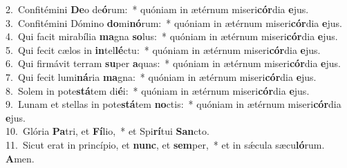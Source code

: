 {2.~}Confitémini \textbf{De}o de\textbf{ó}rum:~* quóniam in ætérnum miseri\textbf{cór}dia \textbf{e}jus.\\
{3.~}Confitémini Dómino \textbf{do}mi\textbf{nó}rum:~* quóniam in ætérnum miseri\textbf{cór}dia \textbf{e}jus.\\
{4.~}Qui facit mirabília \textbf{ma}gna \textbf{so}lus:~* quóniam in ætérnum miseri\textbf{cór}dia \textbf{e}jus.\\
{5.~}Qui fecit cælos in \textbf{in}tel\textbf{lé}ctu:~* quóniam in ætérnum miseri\textbf{cór}dia \textbf{e}jus.\\
{6.~}Qui firmávit terram \textbf{su}per \textbf{a}quas:~* quóniam in ætérnum miseri\textbf{cór}dia \textbf{e}jus.\\
{7.~}Qui fecit lumi\textbf{ná}ria \textbf{ma}gna:~* quóniam in ætérnum miseri\textbf{cór}dia \textbf{e}jus.\\
{8.~}Solem in pote\textbf{stá}tem di\textbf{é}i:~* quóniam in ætérnum miseri\textbf{cór}dia \textbf{e}jus.\\
{9.~}Lunam et stellas in pote\textbf{stá}tem \textbf{no}ctis:~* quóniam in ætérnum miseri\textbf{cór}dia \textbf{e}jus.\\
{10.~}Glória \textbf{Pa}tri, et \textbf{Fí}lio,~* et Spi\textbf{rí}tui \textbf{San}cto.\\
{11.~}Sicut erat in princípio, et \textbf{nunc}, et \textbf{sem}per,~* et in sǽcula sæcu\textbf{ló}rum. \textbf{A}men.\\
